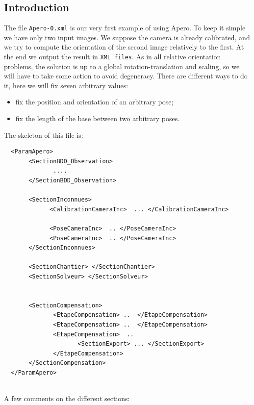 \subsection{Introduction}

The file {\tt Apero-0.xml} is our very first example of using Apero.
To keep it simple we have only two input images. We suppose the camera
is already calibrated, and we try to compute the orientation
of the second image relatively to the first. At the end we output the result
in {\tt XML files}. As in all relative orientation problems, the solution
is  up to a global rotation-translation and scaling, so we will have to
take some action to avoid degeneracy. There are different ways to do it, here we will
fix seven arbitrary values:

\begin{itemize}
  \item  fix the position and orientation of an arbitrary pose;
  \item  fix the length of the base between two arbitrary poses.
\end{itemize}





The skeleton of this file is:

{\scriptsize
\begin{verbatim}
  <ParamApero>
       <SectionBDD_Observation>
              ....
       </SectionBDD_Observation>

       <SectionInconnues>
             <CalibrationCameraInc>  ... </CalibrationCameraInc>

             <PoseCameraInc>  .. </PoseCameraInc>
             <PoseCameraInc>  .. </PoseCameraInc>
       </SectionInconnues>

       <SectionChantier> </SectionChantier>
       <SectionSolveur> </SectionSolveur>


       <SectionCompensation>
              <EtapeCompensation> ..  </EtapeCompensation>
              <EtapeCompensation> ..  </EtapeCompensation>
              <EtapeCompensation>  ..
                     <SectionExport> ... </SectionExport>
              </EtapeCompensation>
       </SectionCompensation>
  </ParamApero>


\end{verbatim}
}

A few comments on the different sections:

